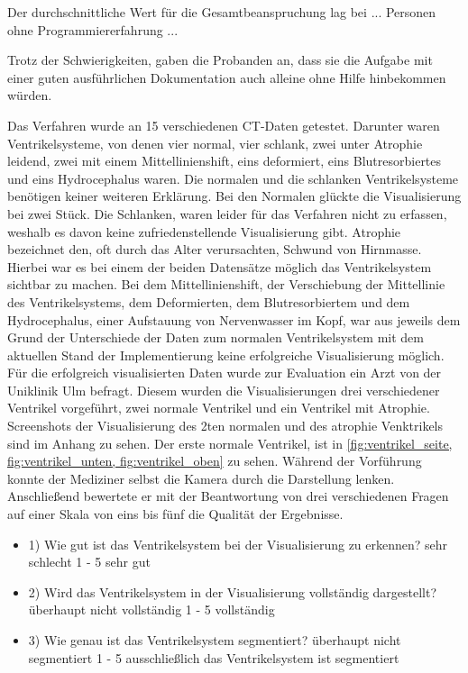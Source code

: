 Der durchschnittliche Wert für die Gesamtbeanspruchung lag bei ... Personen ohne Programmiererfahrung ...

 
Trotz der Schwierigkeiten,  gaben die Probanden an, dass sie die Aufgabe mit einer guten ausführlichen Dokumentation auch alleine ohne Hilfe hinbekommen würden.




Das Verfahren wurde an 15 verschiedenen CT-Daten getestet. Darunter waren Ventrikelsysteme, von denen vier normal, vier schlank, zwei unter Atrophie leidend, zwei mit einem Mittellinienshift, eins deformiert, eins Blutresorbiertes und eins Hydrocephalus waren.
Die normalen und die schlanken Ventrikelsysteme benötigen keiner weiteren Erklärung. Bei den Normalen glückte die Visualisierung bei zwei Stück. Die Schlanken, waren leider für das Verfahren nicht zu erfassen, weshalb es davon keine zufriedenstellende Visualisierung gibt. Atrophie bezeichnet den, oft durch das Alter verursachten, Schwund von Hirnmasse. Hierbei war es bei einem der beiden Datensätze möglich das Ventrikelsystem sichtbar zu machen. Bei dem Mittellinienshift, der Verschiebung der Mittellinie des Ventrikelsystems, dem Deformierten, dem Blutresorbiertem und dem Hydrocephalus, einer Aufstauung von Nervenwasser im Kopf, war aus jeweils dem Grund der Unterschiede der Daten zum normalen Ventrikelsystem mit dem aktuellen Stand der Implementierung keine erfolgreiche Visualisierung möglich.
\newline
Für die erfolgreich visualisierten Daten wurde zur Evaluation ein Arzt von der Uniklinik Ulm befragt. Diesem wurden die Visualisierungen drei verschiedener Ventrikel vorgeführt, zwei normale Ventrikel und ein Ventrikel mit Atrophie. Screenshots der Visualisierung des 2ten normalen und des atrophie Venktrikels sind im Anhang zu sehen. Der erste normale Ventrikel, ist in \autoref{fig:ventrikel_seite, fig:ventrikel_unten, fig:ventrikel_oben} zu sehen. Während der Vorführung konnte der Mediziner selbst die Kamera durch die Darstellung lenken. Anschließend bewertete er mit der Beantwortung von drei verschiedenen Fragen auf einer Skala von eins bis fünf die Qualität der Ergebnisse.
\begin{itemize}
	\item 1) Wie gut ist das Ventrikelsystem bei der Visualisierung zu erkennen? \newline sehr schlecht 1 - 5 sehr gut
	\item 2) Wird das Ventrikelsystem in der Visualisierung vollständig dargestellt? \newline überhaupt nicht vollständig 1 - 5 vollständig
	\item 3) Wie genau ist das Ventrikelsystem segmentiert? \newline überhaupt nicht segmentiert 1 - 5 ausschließlich das Ventrikelsystem ist segmentiert
\end{itemize}



